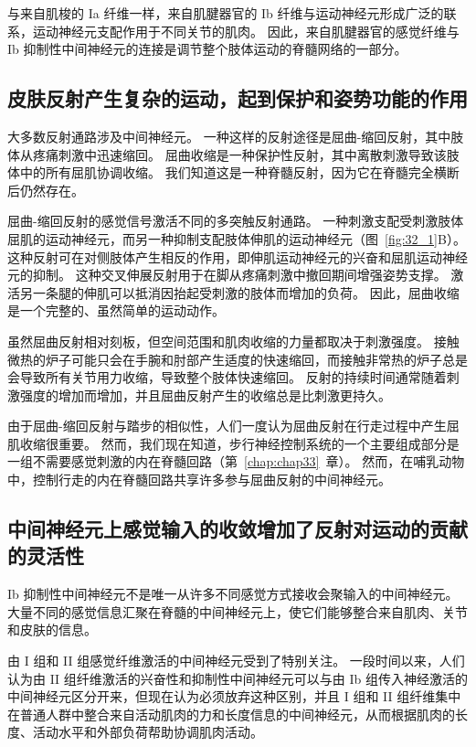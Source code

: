 与来自肌梭的 Ia 纤维一样，来自肌腱器官的 Ib 纤维与运动神经元形成广泛的联系，运动神经元支配作用于不同关节的肌肉。
因此，来自肌腱器官的感觉纤维与 Ib 抑制性中间神经元的连接是调节整个肢体运动的脊髓网络的一部分。



\subsection{皮肤反射产生复杂的运动，起到保护和姿势功能的作用}

大多数反射通路涉及中间神经元。
一种这样的反射途径是屈曲-缩回反射，其中肢体从疼痛刺激中迅速缩回。
屈曲收缩是一种保护性反射，其中离散刺激导致该肢体中的所有屈肌协调收缩。
我们知道这是一种脊髓反射，因为它在脊髓完全横断后仍然存在。


屈曲-缩回反射的感觉信号激活不同的多突触反射通路。 
一种刺激支配受刺激肢体屈肌的运动神经元，而另一种抑制支配肢体伸肌的运动神经元（图~\ref{fig:32_1}B）。
这种反射可在对侧肢体产生相反的作用，即伸肌运动神经元的兴奋和屈肌运动神经元的抑制。
这种交叉伸展反射用于在脚从疼痛刺激中撤回期间增强姿势支撑。
激活另一条腿的伸肌可以抵消因抬起受刺激的肢体而增加的负荷。
因此，屈曲收缩是一个完整的、虽然简单的运动动作。


虽然屈曲反射相对刻板，但空间范围和肌肉收缩的力量都取决于刺激强度。
接触微热的炉子可能只会在手腕和肘部产生适度的快速缩回，而接触非常热的炉子总是会导致所有关节用力收缩，导致整个肢体快速缩回。
反射的持续时间通常随着刺激强度的增加而增加，并且屈曲反射产生的收缩总是比刺激更持久。


由于屈曲-缩回反射与踏步的相似性，人们一度认为屈曲反射在行走过程中产生屈肌收缩很重要。
然而，我们现在知道，步行神经控制系统的一个主要组成部分是一组不需要感觉刺激的内在脊髓回路（第~\ref{chap:chap33}~章）。
然而，在哺乳动物中，控制行走的内在脊髓回路共享许多参与屈曲反射的中间神经元。



\subsection{中间神经元上感觉输入的收敛增加了反射对运动的贡献的灵活性}

Ib 抑制性中间神经元不是唯一从许多不同感觉方式接收会聚输入的中间神经元。
大量不同的感觉信息汇聚在脊髓的中间神经元上，使它们能够整合来自肌肉、关节和皮肤的信息。


由 I 组和 II 组感觉纤维激活的中间神经元受到了特别关注。
一段时间以来，人们认为由 II 组纤维激活的兴奋性和抑制性中间神经元可以与由 Ib 组传入神经激活的中间神经元区分开来，但现在认为必须放弃这种区别，并且 I 组和 II 组纤维集中在普通人群中整合来自活动肌肉的力和长度信息的中间神经元，从而根据肌肉的长度、活动水平和外部负荷帮助协调肌肉活动。



